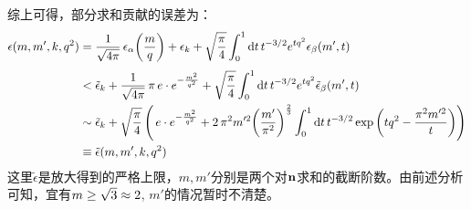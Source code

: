 \documentclass[preview,10pt,border=8pt]{standalone}
\begin{document}
	\newparagraph
	综上可得，部分求和贡献的误差为：
	\begin{equation}
	\begin{aligned}
		\epsilon(m,m',k,q^2)
		&= \frac{1}{\sqrt{4\pi}}\,
			\epsilon_\alpha\pqty{\frac{m}{q}}
		+ \epsilon_k
		+ \sqrt{\frac{\pi}{4}}
			\int_{0}^{1} \dd{t} t^{-3/2} e^{tq^2}
			\epsilon_\beta(m',t) \\[.8ex]
		&< \tilde{\epsilon}_k
		+ \frac{1}{\sqrt{4\pi}}\,
			\pi\,e\cdot e^{- \frac{m^2}{q^2}}
		+ \sqrt{\frac{\pi}{4}}
			\int_{0}^{1} \dd{t} t^{-3/2} e^{tq^2}
			\tilde{\epsilon}_\beta(m',t) \\
		&\sim \tilde{\epsilon}_k
		+ \sqrt{\frac{\pi}{4}}\,\pqty{\,
			e\cdot e^{- \frac{m^2}{q^2}}
		+ 2\,\pi ^2 m'^2
			\pqty\bigg{\frac{m'}{\pi^2}}^{\frac{2}{3}}
			\int_{0}^{1} \dd{t} t^{-3/2} 
			\exp\pqty{tq^2 - \frac{\pi^2 m'^2}{t}}} \\
		&\equiv \tilde{\epsilon}(m,m',k,q^2)
	\end{aligned}
	\end{equation}
	这里$\tilde{\epsilon}$是放大得到的严格上限，$m,m'$分别是两个对$\vb{n}$求和的截断阶数。由前述分析可知，宜有$m \ge\nolinebreak \sqrt{3} \approx 2$, $m'$的情况暂时不清楚。
\end{document}
